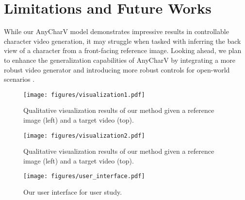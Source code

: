 




\section{Limitations and Future Works}

\label{sec:appendix_limitations}

While our AnyCharV model demonstrates impressive results in controllable character video generation, it may struggle when tasked with inferring the back view of a character from a front-facing reference image. 
Looking ahead, we plan to enhance the generalization capabilities of AnyCharV by integrating a more robust video generator and introducing more robust controls for open-world scenarios \cite{wang2024efficient,che2024gamegen,wang2024open}.





\begin{figure*}[htb]
    \centering
    \texttt{[image: figures/visualization1.pdf]}
    \caption{Qualitative visualization results of our method given a reference image (left) and a target video (top).}
    \label{fig:visualization1}
\end{figure*}


\begin{figure*}[htb]
    \centering
    \texttt{[image: figures/visualization2.pdf]}
    \caption{Qualitative visualization results of our method given a reference image (left) and a target video (top).}
    \label{fig:visualization2}
\end{figure*}


\begin{figure*}[htb]
    \centering
    \texttt{[image: figures/user\_interface.pdf]}
    \caption{Our user interface for user study.}
    \label{fig:user_interface}
\end{figure*}
